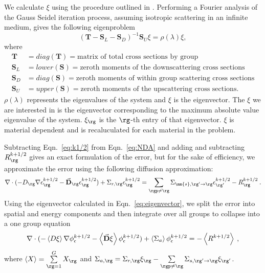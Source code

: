   We calculate $\xi$ using the procedure outlined in \cite{evans-upscat}. Performing a Fourier analysis of the Gauss Seidel iteration process, assuming isotropic scattering in an infinite medium, gives the following eigenproblem
  \begin{equation}
      (\textbf{T} - \textbf{S}_L - \textbf{S}_D)^{-1}\textbf{S}_U \xi = \rho(\lambda)\xi,
    \label{eq:eigenvector}
  \end{equation}
  where
  \begin{align*}
      \textbf{T} &= diag(\textbf{T}) =  \text{matrix of total cross sections by group} \\
      \textbf{S}_L &= lower(\textbf{S}) = \text{zeroth moments of the downscattering cross sections} \\
      \textbf{S}_D &= diag(\textbf{S}) = \text{zeroth moments of within group scattering cross sections} \\
      \textbf{S}_U &= upper(\textbf{S}) = \text{zeroth moments of the upscattering cross sections.}
  \end{align*}
  $\rho(\lambda)$ represents the eigenvalues of the system and $\xi$ is the eigenvector. The $\xi$ we are interested in is the eigenvector corresponding to the maximum absolute value eigenvalue of the system. $\xi_\rg$ is the $\rg$-th entry of that eigenvector. $\xi$ is material dependent and is recaluculated for each material in the problem.

  Subtracting Eqn.~\eqref{eq:k1/2} from Eqn.~\eqref{eq:NDA} and adding and subtracting $R_\rg^{k+1/2}$ gives an exact formulation of the error, but for the sake of efficiency, we approximate the error using the following diffusion approximation:
  \begin{equation}
  \nabla\cdot(-D_\rg  \nabla \epsilon_\rg^{k+1/2} - \vec{\bf D}_\rg
  \epsilon_\rg^{k+1/2}) + \Sigma_{r,\rg}  \epsilon_\rg^{k+1/2} =  \sum\limits_{\substack{\rgp\neq\rg}} \Sigma_{\mm{s},\rg' \to\rg}  \epsilon_{\rg'}^{k+1/2} -  R^{k+1/2}_\rg \:.
  \end{equation}
  Using the eigenvector calculated in Eqn.~\eqref{eq:eigenvector}, we split the error into spatial and energy components and then integrate over all groups to collapse into a one group equation
  \begin{equation}
  \nabla\cdot(-\left< D \xi \right> \nabla \phi_{\epsilon}^{k+1/2} - \left<\vec{\bf D} \xi
  \right> \phi_{\epsilon}^{k+1/2}) + \left< \Sigma_{a} \right> \phi_{\epsilon}^{k+1/2} = - \left< R^{k+1/2} \right> \:,\label{eq:collapsed}
  \end{equation}
  where $\left< X \right> = \sum\limits_{\rg = 1}^G X_\rg $ and $\Sigma_{a,\rg}  = \Sigma_{r,\rg}\xi_\rg - \sum\limits_{\rgp\neq\rg} \Sigma_{s,\rg'\rightarrow \rg} \xi_{\rg'}$.

